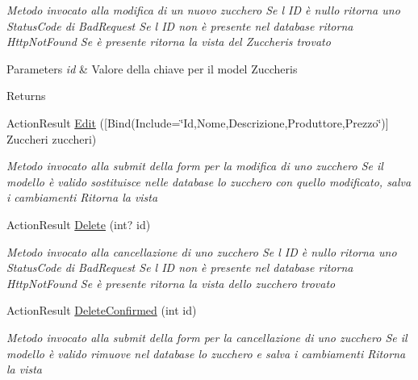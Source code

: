 \begin{DoxyCompactItemize}
\begin{DoxyCompactList}\small\item\em Metodo invocato alla modifica di un nuovo zucchero Se l\textquotesingle{} ID è nullo ritorna uno Status\+Code di Bad\+Request Se l\textquotesingle{} ID non è presente nel database ritorna Http\+Not\+Found Se è presente ritorna la vista del Zuccheris trovato 
\begin{DoxyParams}{Parameters}
{\em id} & Valore della chiave per il model Zuccheris\\
\hline
\end{DoxyParams}
\begin{DoxyReturn}{Returns}

\end{DoxyReturn}
\end{DoxyCompactList}\item 
Action\+Result \mbox{\hyperlink{class_brew_day2_1_1_controllers_1_1_zuccheris_controller_a52aadaa2bd2a5f5874efec4d50a0bee9}{Edit}} (\mbox{[}Bind(Include=\char`\"{}Id,Nome,Descrizione,Produttore,Prezzo\char`\"{})\mbox{]} Zuccheri zuccheri)
\begin{DoxyCompactList}\small\item\em Metodo invocato alla submit della form per la modifica di uno zucchero Se il modello è valido sostituisce nelle database lo zucchero con quello modificato, salva i cambiamenti Ritorna la vista \end{DoxyCompactList}\item 
Action\+Result \mbox{\hyperlink{class_brew_day2_1_1_controllers_1_1_zuccheris_controller_ac3ee0233b27ac4021c5d78838ea96e78}{Delete}} (int? id)
\begin{DoxyCompactList}\small\item\em Metodo invocato alla cancellazione di uno zucchero Se l\textquotesingle{} ID è nullo ritorna uno Status\+Code di Bad\+Request Se l\textquotesingle{} ID non è presente nel database ritorna Http\+Not\+Found Se è presente ritorna la vista dello zucchero trovato \end{DoxyCompactList}\item 
Action\+Result \mbox{\hyperlink{class_brew_day2_1_1_controllers_1_1_zuccheris_controller_a69bc9afa9b5e056977c31dd50da54964}{Delete\+Confirmed}} (int id)
\begin{DoxyCompactList}\small\item\em Metodo invocato alla submit della form per la cancellazione di uno zucchero Se il modello è valido rimuove nel database lo zucchero e salva i cambiamenti Ritorna la vista \end{DoxyCompactList}\end{DoxyCompactItemize}
